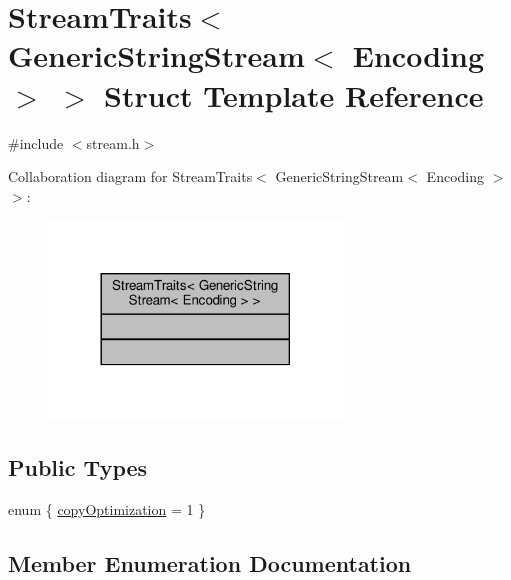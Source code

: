 \hypertarget{structStreamTraits_3_01GenericStringStream_3_01Encoding_01_4_01_4}{}\section{Stream\+Traits$<$ Generic\+String\+Stream$<$ Encoding $>$ $>$ Struct Template Reference}
\label{structStreamTraits_3_01GenericStringStream_3_01Encoding_01_4_01_4}


{\ttfamily \#include $<$stream.\+h$>$}



Collaboration diagram for Stream\+Traits$<$ Generic\+String\+Stream$<$ Encoding $>$ $>$\+:
\nopagebreak
\begin{figure}[H]
\begin{center}
\leavevmode
\includegraphics[width=221pt]{structStreamTraits_3_01GenericStringStream_3_01Encoding_01_4_01_4__coll__graph}
\end{center}
\end{figure}
\subsection*{Public Types}
\begin{DoxyCompactItemize}
\item 
enum \{ \hyperlink{structStreamTraits_3_01GenericStringStream_3_01Encoding_01_4_01_4_ac055740d6433e887c968d1aa73c9559baaeb90f06c2d643f47563c64eb8d4cda7}{copy\+Optimization} = 1
 \}
\end{DoxyCompactItemize}


\subsection{Member Enumeration Documentation}
\mbox{\label{structStreamTraits_3_01GenericStringStream_3_01Encoding_01_4_01_4_ac055740d6433e887c968d1aa73c9559b}} 
